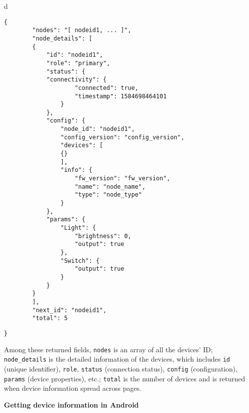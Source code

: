 \documentclass[a4paper,12pt]{book}
\begin{document}
\begin{codebloc}
\begin{tabular}{d}
\vspace{2pt}
\begin{verbatim}
{
        "nodes": "[ nodeid1, ... ]",
        "node_details": [
        {
            "id": "nodeid1",
            "role": "primary",
            "status": {
            "connectivity": {
                    "connected": true,
                    "timestamp": 1584698464101
                }
            },
            "config": {
                "node_id": "nodeid1",
                "config_version": "config_version",
                "devices": [
                {}
                ],
                "info": {
                    "fw_version": "fw_version",
                    "name": "node_name",
                    "type": "node_type"
                }
            },
            "params": {
                "Light": {
                    "brightness": 0,
                    "output": true
                },
                "Switch": {
                    "output": true
                }
            }
        }
        ],
        "next_id": "nodeid1",
        "total": 5
\end{verbatim}
\verb|}|
\end{tabular}
\end{codebloc}

Among these returned fields, \verb|nodes| is an array of all the devices’ ID; \verb|node_details| is the detailed information of the devices, which includes \verb|id| (unique identifier), \verb|role|, \verb|status| (connection status), \verb|config| (configuration), \verb|params| (device properties), etc.; \verb|total| is the number of devices and is returned when device information spread across pages.

\textbf{Getting device information in Android}

\end{document}

